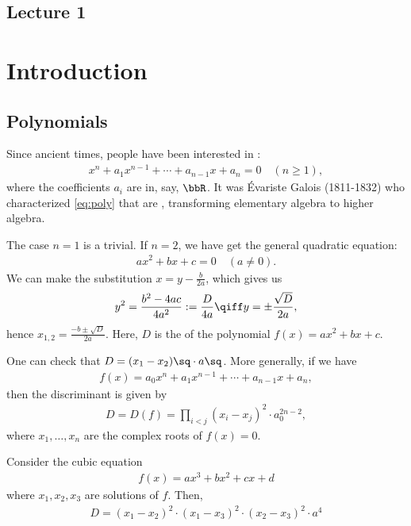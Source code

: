 \documentclass[a4paper]{article}
\begin{document}
\subsection*{Lecture 1} %
\section{Introduction}
\subsection{Polynomials}
Since ancient times, people have been interested in :
\begin{align}
  x^n + a_{1}x^{n-1} + \cdots + a_{n-1}x + a_n = 0\quad (n\geq 1),\label{eq:poly}
\end{align}
where the coefficients \( a_i \) are in, say, \( \bbR \).
It was \'Evariste Galois (1811-1832) who characterized \eqref{eq:poly} that are , transforming elementary algebra to higher algebra.

The case \( n=1 \) is a trivial.
If \( n=2 \), we have get the general quadratic equation:
\begin{align*}
  ax^2+bx+c = 0\quad (a\neq 0).
\end{align*}
We can make the substitution \( x=y-\frac{b}{2a} \), which gives us
\begin{align*}
  y^2 = \frac{b^2-4ac}{4a^2} := \frac{D}{4a} \qiff y=\pm\frac{\sqrt D}{2a},
\end{align*}
hence \( x_{1,2} = \frac{-b\pm \sqrt D}{2a} \).
Here, \( D \) is the  of the polynomial \( f(x) = ax^2+bx+c \).

One can check that \( D = (x_1-x_2)\sq\cdot a\sq \).
More generally, if we have \begin{align*}
  f(x) = a_0x^n+a_{1}x^{n-1}+\cdots+a_{n-1}x+a_n,
\end{align*}
then the discriminant is given by \begin{align*}
  D = D(f) = \prod_{i<j}(x_i-x_j)^2\cdot a_0^{2n-2},
\end{align*}
where \( x_1, \ldots, x_n \) are the complex roots of \( f(x) = 0 \).

\begin{example}
  Consider the cubic equation \begin{align*}
    f(x) = ax^3+bx^2+cx+d
  \end{align*} where \( x_1, x_2, x_3 \) are solutions of \( f \). Then, \begin{align*}
    D = (x_1-x_2)^2\cdot(x_1-x_3)^2\cdot(x_2-x_3)^2 \cdot a^4
  \end{align*}
\end{example}
\end{document}
